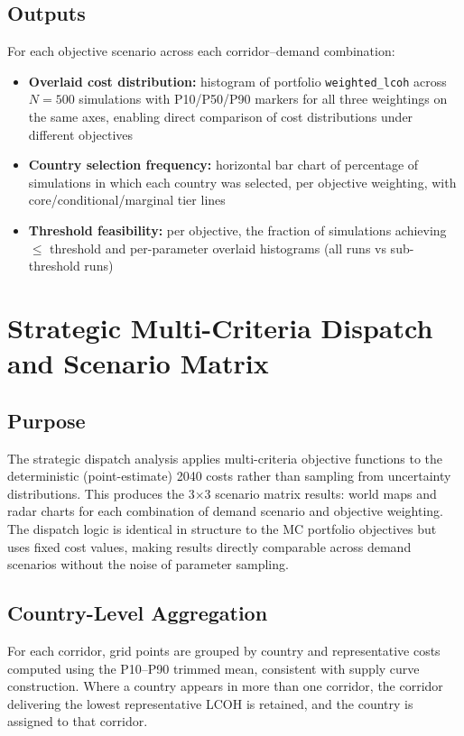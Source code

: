 \subsection{Outputs}

For each objective scenario across each corridor--demand combination:
\begin{itemize}
    \item \textbf{Overlaid cost distribution:} histogram of portfolio \texttt{weighted\_lcoh} across $N = 500$ simulations with P10/P50/P90 markers for all three weightings on the same axes, enabling direct comparison of cost distributions under different objectives
    \item \textbf{Country selection frequency:} horizontal bar chart of percentage of simulations in which each country was selected, per objective weighting, with core/conditional/marginal tier lines
    \item \textbf{Threshold feasibility:} per objective, the fraction of simulations achieving $\leq$ threshold and per-parameter overlaid histograms (all runs vs sub-threshold runs)
\end{itemize}

\section{Strategic Multi-Criteria Dispatch and Scenario Matrix}
\label{sec:strategic-dispatch}

\subsection{Purpose}

The strategic dispatch analysis applies multi-criteria objective functions to the deterministic (point-estimate) 2040 costs rather than sampling from uncertainty distributions. This produces the 3$\times$3 scenario matrix results: world maps and radar charts for each combination of demand scenario and objective weighting. The dispatch logic is identical in structure to the MC portfolio objectives but uses fixed cost values, making results directly comparable across demand scenarios without the noise of parameter sampling.

\subsection{Country-Level Aggregation}

For each corridor, grid points are grouped by country and representative costs computed using the P10--P90 trimmed mean, consistent with supply curve construction. Where a country appears in more than one corridor, the corridor delivering the lowest representative LCOH is retained, and the country is assigned to that corridor.

